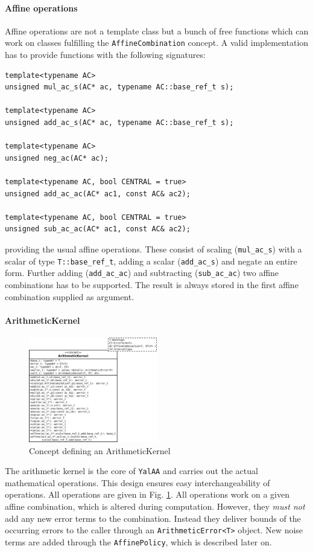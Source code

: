 \documentclass[a4]{scrartcl}
\newcommand{\yalaa}{\texttt{YalAA}\xspace}
\begin{document}
\paragraph{Affine operations}
\label{sec:affine-operations}
Affine operations are not a template class but a bunch of free functions which
can work on classes fulfilling the \texttt{AffineCombination} concept. A valid
implementation has to provide functions with the following signatures:
\begin{verbatim}
template<typename AC>
unsigned mul_ac_s(AC* ac, typename AC::base_ref_t s);

template<typename AC>
unsigned add_ac_s(AC* ac, typename AC::base_ref_t s);

template<typename AC>
unsigned neg_ac(AC* ac);

template<typename AC, bool CENTRAL = true>
unsigned add_ac_ac(AC* ac1, const AC& ac2);

template<typename AC, bool CENTRAL = true>
unsigned sub_ac_ac(AC* ac1, const AC& ac2); 
\end{verbatim}
providing the usual affine operations. These consist of scaling
(\texttt{mul\_ac\_s}) with a scalar of type \texttt{T::base\_ref\_t}, adding a
scalar (\texttt{add\_ac\_s}) and negate an entire form. Further adding
(\texttt{add\_ac\_ac}) and subtracting (\texttt{sub\_ac\_ac}) two affine
combinations has to be supported. The result is always stored in the first
affine combination supplied as argument.

\paragraph{ArithmeticKernel}
\label{sec:arithmetickernel}
\begin{figure}[h]
  \centering
  \includegraphics[width=0.5\textwidth]{arithmetickernel}
  \caption{Concept defining an ArithmeticKernel}
  \label{fig:arith_kernel}
\end{figure}
The arithmetic kernel is the core of \yalaa and carries out the actual
mathematical operations. This design ensures easy interchangeability of
operations. All operations are given in Fig. \ref{fig:arith_kernel}. All
operations work on a given affine combination, which is altered during
computation. However, they \emph{must not} add any new error terms to the
combination. Instead they deliver bounds of the occurring
errors to the caller through an \texttt{ArithmeticError<T>} object. New
noise terms are added through the \texttt{AffinePolicy}, which is described
later on. 
\end{document}
